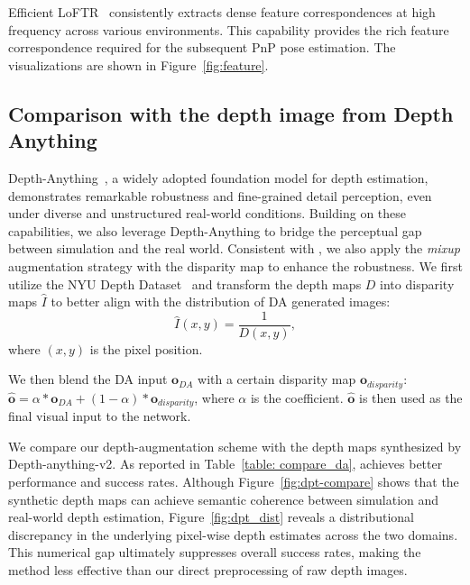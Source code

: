 Efficient LoFTR~\cite{wang2024efficient} consistently extracts dense feature correspondences at high frequency across various environments. This capability provides the rich feature correspondence required for the subsequent PnP pose estimation. The visualizations are shown in Figure~\ref{fig:feature}. 


\subsection{Comparison with the depth image from Depth Anything }


Depth-Anything~\cite{yang2024depth,yang2024depth2}, a widely adopted foundation model for depth estimation, demonstrates remarkable robustness and fine-grained detail perception, even under diverse and unstructured real-world conditions. Building on these capabilities, we also leverage Depth-Anything to bridge the perceptual gap between simulation and the real world. Consistent with \ourshort, we also apply the \textit{mixup} augmentation strategy with the disparity map to enhance the robustness. We first utilize the NYU Depth Dataset~\cite{silberman2012indoor} and transform the depth maps $D$ into disparity maps $\hat{I}$ to better align with the  distribution of DA generated images:
\begin{equation}
    \hat{I}(x, y) = \frac{1}{D(x, y)},
\end{equation}
where $(x, y)$ is the pixel position.

We then blend the DA input $\boldsymbol{o}_{DA}$ with a certain disparity map $\boldsymbol{o}_{disparity}$: ${\boldsymbol{\hat{o}}} = \alpha*\boldsymbol{o}_{DA} + (1 - \alpha)*\boldsymbol{o}_{disparity}$, where $\alpha$ is the coefficient. ${\boldsymbol{\hat{o}}}$ is then used as the final visual input to the network.

We compare our  depth-augmentation scheme with the depth maps synthesized by Depth-anything-v2. As reported in Table~\ref{table: compare_da}, \ourshort achieves better performance and success rates. Although Figure~\ref{fig:dpt-compare} shows that the synthetic depth maps can achieve semantic coherence between simulation and real-world depth estimation, Figure~\ref{fig:dpt_dist} reveals a distributional discrepancy in the underlying pixel-wise depth estimates across the two domains. This numerical gap ultimately suppresses overall success rates, making the method less effective than our direct preprocessing of raw depth images.


